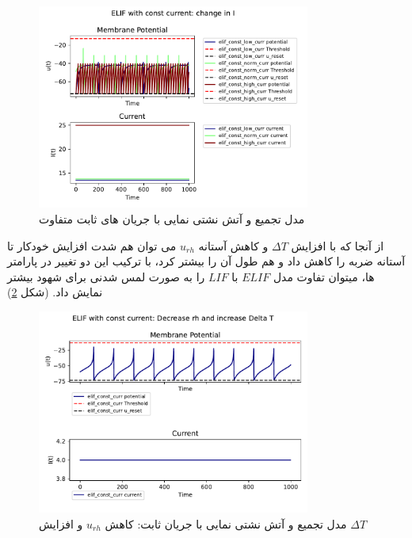 \documentclass{article}
\begin{document}
                \begin{figure}[H]
                    \centering
                    \includegraphics[width=0.8\textwidth]{plots/ELIF with const current: change in I.pdf} 
                    \caption{مدل تجمیع و آتش نشتی نمایی با جریان های ثابت متفاوت}
                    \label{fig:elif-const-change-curr}
                \end{figure}
                از آنجا که با افزایش 
                $\Delta T$ 
                و کاهش آستانه 
                $u_{rh}$ 
                می توان هم شدت افزایش خودکار تا آستانه ضربه را کاهش داد و هم طول آن را بیشتر کرد، با ترکیب این دو تغییر در پارامتر ها، میتوان تفاوت مدل 
                $ELIF$ 
                با $LIF$ 
                را به صورت لمس شدنی برای شهود بیشتر نمایش داد.
                (شکل \ref{fig:elif-const-curr-change-rh-T})
                \begin{figure}[H]
                    \centering
                    \includegraphics[width=0.8\textwidth]{plots/ELIF with const current: Decrease rh and increase Delta T.pdf} 
                    \caption{مدل تجمیع و آتش نشتی نمایی با جریان ثابت: کاهش $u_{rh}$ و افزایش $\Delta T$}
                    \label{fig:elif-const-curr-change-rh-T}
                \end{figure}
\end{document}
